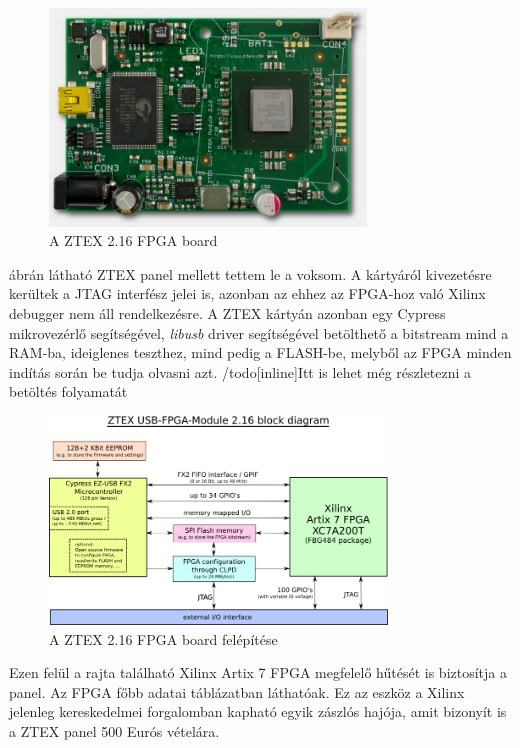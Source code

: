 \begin{figure}[!ht]
	\centering
	\includegraphics[width = 0.75\textwidth]{figures/fpga216.jpg}
	\caption{A ZTEX 2.16 FPGA board} 
	\label{fig:ztex}
\end{figure}

 ábrán látható ZTEX panel mellett tettem le a voksom. A kártyáról kivezetésre kerültek a JTAG interfész jelei is, azonban az ehhez az FPGA-hoz való Xilinx debugger nem áll rendelkezésre. A ZTEX kártyán azonban egy Cypress mikrovezérlő segítségével, \emph{libusb} driver segítségével betölthető a bitstream mind a RAM-ba, ideiglenes teszthez, mind pedig a FLASH-be, melyből az FPGA minden indítás során be tudja olvasni azt.
/todo[inline]{Itt is lehet még részletezni a betöltés folyamatát}

\begin{figure}[!ht]
	\centering
	\includegraphics[width = 0.8\textwidth]{figures/usb-fpga-216.png}
	\caption{A ZTEX 2.16 FPGA board felépítése} 
	\label{fig:ztex_block}
\end{figure}

Ezen felül a rajta található Xilinx Artix 7 FPGA megfelelő hűtését is biztosítja a panel. Az FPGA főbb adatai  táblázatban láthatóak. Ez az eszköz a Xilinx jelenleg kereskedelmei forgalomban kapható egyik zászlós hajója, amit bizonyít is a ZTEX panel 500 Eurós vételára.

